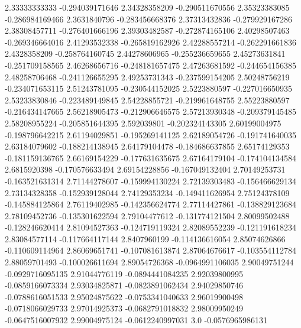   2.33333333333  -0.294039171646
  2.34328358209  -0.290511670556
  2.35323383085  -0.286984169466
   2.3631840796  -0.283456668376
  2.37313432836  -0.279929167286
  2.38308457711  -0.276401666196
  2.39303482587  -0.272874165106
  2.40298507463  -0.269346664016
  2.41293532338  -0.265819162926
  2.42288557214  -0.262291661836
   2.4328358209  -0.258764160745
  2.44278606965  -0.255236659655
  2.45273631841  -0.251709158565
  2.46268656716  -0.248181657475
  2.47263681592  -0.244654156385
  2.48258706468  -0.241126655295
  2.49253731343  -0.237599154205
  2.50248756219  -0.234071653115
  2.51243781095  -0.230544152025
   2.5223880597  -0.227016650935
  2.53233830846  -0.223489149845
  2.54228855721  -0.219961648755
  2.55223880597  -0.216434147665
  2.56218905473  -0.212906646575
  2.57213930348  -0.209379145485
  2.58208955224  -0.205851644395
    2.592039801  -0.202324143305
  2.60199004975  -0.198796642215
  2.61194029851  -0.195269141125
  2.62189054726  -0.191741640035
  2.63184079602  -0.188214138945
  2.64179104478  -0.184686637855
  2.65174129353  -0.181159136765
  2.66169154229  -0.177631635675
  2.67164179104  -0.174104134584
   2.6815920398  -0.170576633494
  2.69154228856  -0.167049132404
  2.70149253731  -0.163521631314
  2.71144278607  -0.159994130224
  2.72139303483  -0.156466629134
  2.73134328358  -0.152939128044
  2.74129353234  -0.149411626954
  2.75124378109  -0.145884125864
  2.76119402985  -0.142356624774
  2.77114427861  -0.138829123684
  2.78109452736  -0.135301622594
  2.79104477612  -0.131774121504
  2.80099502488  -0.128246620414
  2.81094527363  -0.124719119324
  2.82089552239  -0.121191618234
  2.83084577114  -0.117664117144
   2.8407960199  -0.114136616054
  2.85074626866  -0.110609114964
  2.86069651741  -0.107081613874
  2.87064676617  -0.103554112784
  2.88059701493  -0.100026611694
  2.89054726368  -0.0964991106035
  2.90049751244  -0.0929716095135
  2.91044776119  -0.0894441084235
  2.92039800995  -0.0859166073334
  2.93034825871  -0.0823891062434
  2.94029850746  -0.0788616051533
  2.95024875622  -0.0753341040633
  2.96019900498  -0.0718066029733
  2.97014925373  -0.0682791018832
  2.98009950249  -0.0647516007932
  2.99004975124  -0.0612240997031
            3.0  -0.0576965986131
